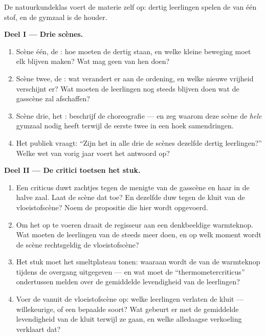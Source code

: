 \begin{problem}\label{pb:g7:states-of-matter:1}
De natuurkundeklas voert de materie zelf op: dertig leerlingen spelen
de  van één stof, en de gymzaal is de houder.

\medskip\noindent\textbf{Deel I --- Drie scènes.}
\begin{enumerate}
  \item Scène één, de : hoe moeten de dertig staan, en
        welke kleine beweging moet elk blijven maken? Wat mag geen
        van hen doen?
  \item Scène twee, de : wat verandert er aan de ordening,
        en welke nieuwe vrijheid verschijnt er? Wat moeten de
        leerlingen nog steeds blijven doen wat de gasscène zal
        afschaffen?
  \item Scène drie, het : beschrijf de choreografie --- en zeg
        waarom deze scène de \emph{hele} gymzaal nodig heeft terwijl
        de eerste twee in een hoek samendringen.
  \item Het publiek vraagt: ``Zijn het in alle drie de scènes
        dezelfde dertig leerlingen?'' Welke wet van vorig jaar voert
        het antwoord op?
\end{enumerate}

\medskip\noindent\textbf{Deel II --- De critici toetsen het stuk.}
\begin{enumerate}[resume]
  \item Een criticus duwt zachtjes tegen de menigte van de
        gasscène en  haar in de halve zaal. Laat de scène dat
        toe? En dezelfde duw tegen de kluit van de
        vloeistofscène? Noem de propositie die hier wordt
        opgevoerd.
  \item Om het \emph{} op te voeren draait de regisseur aan
        een denkbeeldige warmteknop. Wat moeten de leerlingen van de
         steeds meer doen, en op welk moment wordt de scène
        rechtsgeldig de vloeistofscène?
  \item Het stuk moet het smeltplateau tonen: waaraan wordt de
         van de warmteknop tijdens de overgang uitgegeven ---
        en wat moet de ``thermometercriticus'' ondertussen melden over
        de gemiddelde levendigheid van de leerlingen?
  \item Voer de  vanuit de vloeistofscène op: welke
        leerlingen verlaten de kluit --- willekeurige, of een
        bepaalde soort? Wat gebeurt er met de gemiddelde levendigheid
        van de kluit terwijl ze gaan, en welke alledaagse verkoeling
        verklaart dat?
\end{enumerate}


\end{problem}
